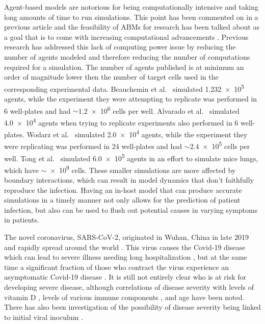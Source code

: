 Agent-based models are notorious for being computationally intensive and taking long amounts of time to run simulations. This point has been commented on in a previous article \cite{gallagher_causes_2018} and the feasibility of ABMs for research has been talked about as a goal that is to come with increasing computational advancements \cite{bauer_agent-based_2009}. Previous research has addressed this lack of computing power issue by reducing the number of agents modeled and therefore reducing the number of computations required for a simulation. The number of agents published is at minimum an order of magnitude lower then the number of target cells used in the corresponding experimental data. Beauchemin et al.\ \cite{beauchemin_simple_2005} simulated \num{1.232e5} agents, while the experiment they were attempting to replicate was performed in 6 well-plates and had $\sim$\num{1.2e6} cells per well. Alvarado et al.\ \cite{alvarado_cellular-level_2018} simulated \num{4.0e4} agents when trying to replicate experiments also performed in 6 well-plates. Wodarz et al.\ \cite{wodarz_laws_2014} simulated \num{2.0e4} agents, while the experiment they were replicating was performed in 24 well-plates and had $\sim$\num{2.4e5} cells per well. Tong et al.\ \cite{tong_development_2015} simulated \num{6.0e5} agents in an effort to simulate mice lungs, which have $\sim$\num{e9} cells. These smaller simulations are more affected by boundary interactions, which can result in model dynamics that don't faithfully reproduce the infection. Having an in-host model that can produce accurate simulations in a timely manner not only allows for the prediction of patient infection, but also can be used to flush out potential causes in varying symptoms in patients. 

The novel coronavirus, SARS-CoV-2, originated in Wuhan, China in late 2019 and rapidly spread around the world \cite{chen20,wu20}. This virus causes the Covid-19 disease which can lead to severe illness needing long hospitalization \cite{sun20,goyal20,jiang20}, but at the same time a significant fraction of those who contract the virus experience an asymptomatic Covid-19 disease \cite{he20}. It is still not entirely clear who is at risk for developing severe disease, although correlations of disease severity with levels of vitamin D \cite{ilie20}, levels of various immune components \cite{liu20imm,liu20imm2,zhang20imm,yang20imm}, and age \cite{borghesi20,zhang20imm} have been noted. There has also been investigation of the possibility of disease severity being linked to initial viral inoculum \cite{little20, guallar20, ghandi20}.

